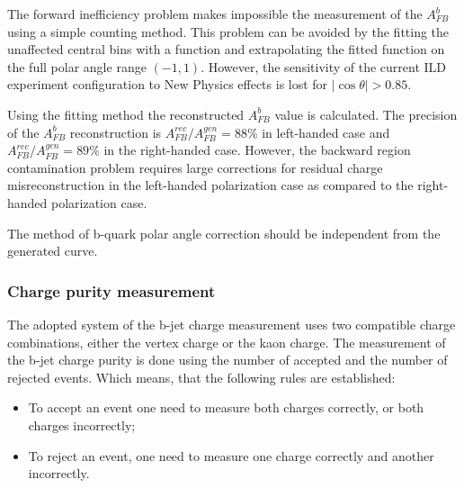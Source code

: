 The forward inefficiency problem makes impossible the measurement of the $A_{FB}^b$ using a simple counting method. This problem can be avoided by the fitting the unaffected central bins with a function and extrapolating the fitted function on the full polar angle range $(-1,1)$. However, the sensitivity of the current ILD experiment configuration to New Physics effects is lost for $|\cos\theta| > 0.85$.

Using the fitting method the reconstructed $A_{FB}^b$ value is calculated. The precision of the $A_{FB}^b$ reconstruction is $A_{FB}^{rec}/A^{gen}_{FB} = 88\%$ in left-handed case and  $A_{FB}^{rec}/A^{gen}_{FB} = 89\%$ in the right-handed case.  
However, the backward region contamination problem requires large corrections for residual charge misreconstruction in the left-handed polarization case as compared to the right-handed polarization case. 

The method of b-quark polar angle correction should be independent from the generated curve. 
%
\subsubsection{Charge purity measurement}
\label{sec:ChargePurity}
The adopted system of the b-jet charge measurement uses two compatible charge combinations, either the vertex charge or the kaon charge. 
The measurement of the b-jet charge purity is done using the number of accepted and the number of rejected events. 
Which means, that the following rules are established:
\begin{itemize}
	\item To accept an event one need to measure both charges correctly, or both charges incorrectly;
	\item To reject an event, one need to measure one charge correctly and another incorrectly. 
\end{itemize}

